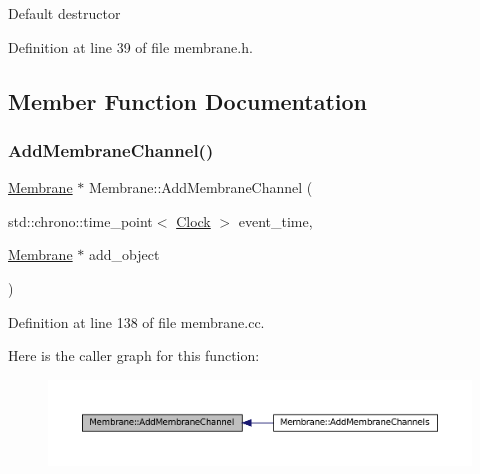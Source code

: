Default destructor 

Definition at line 39 of file membrane.\+h.



\subsection{Member Function Documentation}
\mbox{\label{class_membrane_a3e3b4f55f028541e7513f826d01a689a}} 
\subsubsection{\texorpdfstring{Add\+Membrane\+Channel()}{AddMembraneChannel()}}
{\footnotesize\ttfamily \mbox{\hyperlink{class_membrane}{Membrane}} $\ast$ Membrane\+::\+Add\+Membrane\+Channel (\begin{DoxyParamCaption}\item[{std\+::chrono\+::time\+\_\+point$<$ \mbox{\hyperlink{universe_8h_a0ef8d951d1ca5ab3cfaf7ab4c7a6fd80}{Clock}} $>$}]{event\+\_\+time,  }\item[{\mbox{\hyperlink{class_membrane}{Membrane}} $\ast$}]{add\+\_\+object }\end{DoxyParamCaption})}



Definition at line 138 of file membrane.\+cc.

Here is the caller graph for this function\+:\nopagebreak
\begin{figure}[H]
\begin{center}
\leavevmode
\includegraphics[width=350pt]{class_membrane_a3e3b4f55f028541e7513f826d01a689a_icgraph}
\end{center}
\end{figure}
\mbox{\label{class_membrane_aab591875e3266d6c5af0f7c5f7f21e8f}} 
